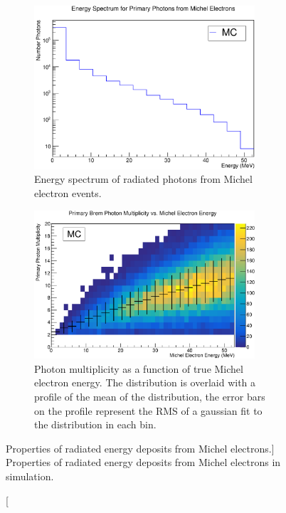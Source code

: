 \begin{figure}

	\centering

	\begin{subfigure}[b]{\textwidth}
		\centering
		\includegraphics[width=0.9\textwidth]{figures/photon_spec.pdf}
		\caption{Energy spectrum of radiated photons from Michel electron events.}
		\label{fig:photon_spec}
	\end{subfigure}

	\vspace{5mm}

	\begin{subfigure}[b]{\textwidth}
		\centering
		\includegraphics[width=0.9\textwidth]{figures/photon_mult.pdf}
		\caption{Photon multiplicity as a function of true Michel electron energy.
		The distribution is overlaid with a profile of the mean of the distribution,
		the error bars on the profile represent the RMS of a gaussian fit to the
		distribution in each bin.}
		\label{fig:photon_mult}
	\end{subfigure}

	\caption
	[Properties of radiated energy deposits from Michel electrons.]
	{Properties of radiated energy deposits from Michel electrons in \protodune{}
	simulation.}

	\label{fig:photon_prop}

\end{figure}

